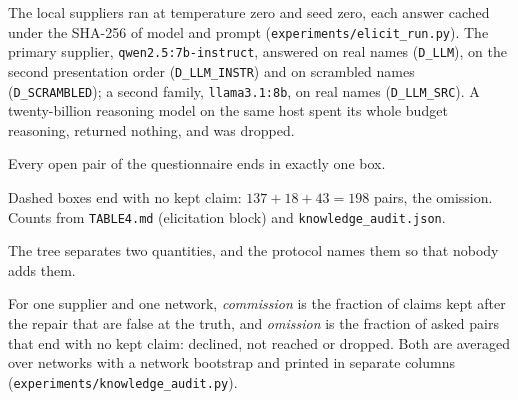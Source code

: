 \begin{sloppypar}
The local suppliers ran at temperature zero and seed zero, each answer cached under the SHA-256 of
model and prompt (\texttt{experiments/elicit\_run.py}). The primary supplier,
\texttt{qwen2.5:7b-instruct}, answered on real names (\texttt{D\_LLM}), on the second presentation order
(\texttt{D\_LLM\_INSTR}) and on scrambled names (\texttt{D\_SCRAMBLED}); a second family,
\texttt{llama3.1:8b}, on real names (\texttt{D\_LLM\_SRC}). A twenty-billion reasoning model on the same
host spent its whole budget reasoning, returned nothing, and was dropped.
\end{sloppypar}

\par\ifdim\dimexpr\pagegoal-\pagetotal\relax<4.2cm\newpage\fi
\begin{exemplo}
Every open pair of the questionnaire ends in exactly one box.
\begin{center}
\end{center}
Dashed boxes end with no kept claim: $137 + 18 + 43 = 198$ pairs, the omission. Counts from
\texttt{TABLE4.md} (elicitation block) and \texttt{knowledge\_audit.json}.
\end{exemplo}

The tree separates two quantities, and the protocol names them so that nobody adds them.

\begin{definicao}
For one supplier and one network, \emph{commission} is the fraction of claims kept after the repair
that are false at the truth, and \emph{omission} is the fraction of asked pairs that end with no kept
claim: declined, not reached or dropped. Both are averaged over networks with a network bootstrap and
printed in separate columns (\texttt{experiments/knowledge\_audit.py}).
\end{definicao}

